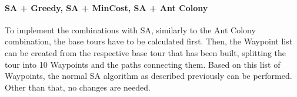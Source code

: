 \paragraph{SA + Greedy, SA + MinCost, SA + Ant Colony}

To implement the combinations with SA, similarly to the Ant Colony combination, the base tours have to be calculated first.
Then, the Waypoint list can be created from the respective base tour that has been built, splitting the tour into 10 Waypoints and the paths connecting them. 
Based on this list of Waypoints, the normal SA algorithm as described previously can be performed.
Other than that, no changes are needed.

